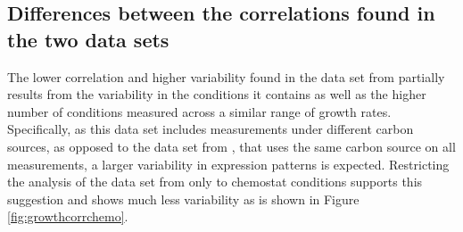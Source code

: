 \subsection{Differences between the correlations found in the two data sets}
\label{heinemannchemo} 

The lower correlation and higher variability found in the data set from \cite{Heinemann2015} partially results from the variability in the conditions it contains as well as the higher number of conditions measured across a similar range of growth rates.
Specifically, as this data set includes measurements under different carbon sources, as opposed to the data set from \cite{Valgepea2013}, that uses the same carbon source on all measurements, a larger variability in expression patterns is expected.
Restricting the analysis of the data set from \cite{Heinemann2015} only to chemostat conditions supports this suggestion and shows much less variability as is shown in Figure \ref{fig:growthcorrchemo}.
